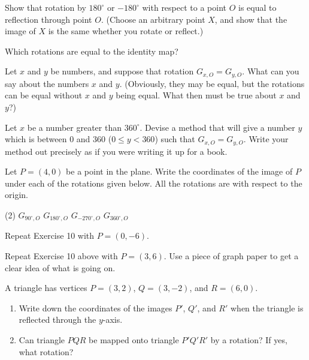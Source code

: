 \documentclass[12pt]{book} %
\begin{document}
\begin{ExerciseList}
\begin{ExerciseList}

\Exercise Show that rotation by $180^\circ$ or $-180^\circ$ with respect to a point $O$ is equal to
reflection through point $O$. (Choose an arbitrary point $X$, and show that the
image of $X$ is the same whether you rotate or reflect.)

\Exercise Which rotations are equal to the identity map?

\Exercise Let $x$ and $y$ be numbers, and suppose that rotation $G_{x,O}=G_{y,O}$. What can
you say about the numbers $x$ and $y$. (Obviously, they may be equal, but the
rotations can be equal without $x$ and $y$ being equal. What then must be true
about $x$ and $y$?)

\Exercise Let $x$ be a number greater than $360^\circ$. Devise a method that will give a
number $y$ which is between $0$ and $360$ ($0\le y<360$) such that $G_{x,O}=G_{y,O}$.
Write your method out precisely as if you were writing it up for a book.

\Exercise Let $P=(4,0)$ be a point in the plane. Write the coordinates of the image of
$P$ under each of the rotations given below. All the rotations are with respect
to the origin.
\begin{tasks}(2)
\task[(a)] $G_{90^\circ,O}$
\task[(b)] $G_{180^\circ,O}$
\task[(c)] $G_{-270^\circ,O}$
\task[(d)] $G_{360^\circ,O}$
\end{tasks}

\Exercise Repeat Exercise 10 with $P=(0,-6)$.

\Exercise Repeat Exercise 10 above with $P=(3,6)$. Use a piece of graph paper to get
a clear idea of what is going on.

\Exercise A triangle has vertices $P=(3,2)$, $Q=(3,-2)$, and $R=(6,0)$.
\begin{enumerate}
\item[(a)] Write down the coordinates of the images $P'$, $Q'$, and $R'$ when the triangle is reflected through the $y$-axis.
\item[(b)] Can triangle $PQR$ be mapped onto triangle $P'Q'R'$ by a rotation? If yes,
what rotation?
\end{enumerate}


\end{ExerciseList}
\end{ExerciseList}
\end{document}
